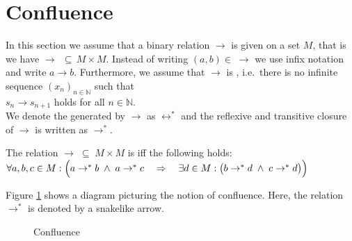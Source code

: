 \section{Confluence}
In this section we assume that a binary relation $\rightarrow$ is given on a set $M$, that is we have
$\rightarrow \,\;\subseteq\, M \!\times\! M$.  Instead of writing $(a, b) \in\; \rightarrow$ we use infix notation and write
$a \rightarrow b$.  Furthermore, we assume that $\rightarrow$ is ,
i.e.~there is no infinite sequence $(x_n)_{n\in\mathbb{N}}$ such that
\\[0.2cm]
\hspace*{1.3cm}
$s_n \rightarrow s_{n+1}$ \quad holds for all $n\in\mathbb{N}$.
\\[0.2cm]
We denote the  generated by $\rightarrow$ as $\leftrightarrow^*$ and the reflexive and
transitive closure of $\rightarrow$ is written as $\rightarrow^*$.

\begin{Definition}[Confluence] 
  The relation $\rightarrow \;\subseteq\; M \times M$ is  iff the following holds:
  \\[0.2cm]
  \hspace*{1.3cm}
  $\forall a, b, c \in M: \Bigl(a \rightarrow^* b \;\wedge\; a \rightarrow^*c \quad\Rightarrow\quad
   \exists d \in M: \bigl(b \rightarrow^* d \;\wedge\; c \rightarrow^* d\bigr)\Bigr)
  $ \eox
\end{Definition}

\noindent
Figure \ref{fig:confluence.tikz} shows a diagram picturing the notion of confluence.
Here, the relation $\rightarrow^*$ is denoted by a snakelike arrow.
\begin{figure}[!ht]
    \centering
    \caption{Confluence}
    \label{fig:confluence.tikz}
\end{figure}

